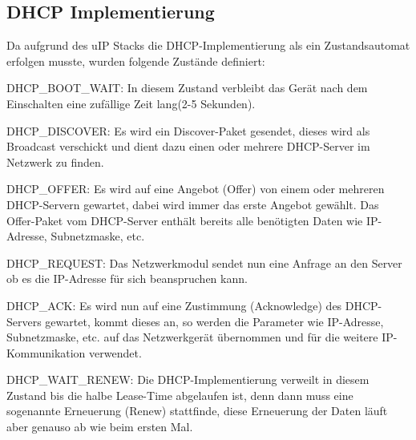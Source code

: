 \documentclass[a4paper,14pt,headsepline]{scrartcl}
\begin{document}
\subsection{DHCP Implementierung}
Da aufgrund des uIP Stacks die DHCP-Implementierung als ein Zustandsautomat erfolgen musste, wurden folgende Zustände definiert:

DHCP\_BOOT\_WAIT: In diesem Zustand verbleibt das Gerät nach dem Einschalten eine zufällige Zeit lang(2-5 Sekunden).

DHCP\_DISCOVER: Es wird ein Discover-Paket gesendet, dieses wird als Broadcast verschickt und dient dazu einen oder mehrere DHCP-Server im Netzwerk zu finden.

DHCP\_OFFER: Es wird auf eine Angebot (Offer) von einem oder mehreren DHCP-Servern gewartet, dabei wird immer das erste Angebot gewählt. Das Offer-Paket vom DHCP-Server enthält bereits alle benötigten Daten wie IP-Adresse, Subnetzmaske, etc.

DHCP\_REQUEST: Das Netzwerkmodul sendet nun eine Anfrage an den Server ob es die IP-Adresse für sich beanspruchen kann.

DHCP\_ACK: Es wird nun auf eine Zustimmung (Acknowledge) des DHCP-Servers gewartet, kommt dieses an, so werden die Parameter wie IP-Adresse, Subnetzmaske, etc. auf das Netzwerkgerät übernommen und für die weitere IP-Kommunikation verwendet.

DHCP\_WAIT\_RENEW: Die DHCP-Implementierung verweilt in diesem Zustand bis die halbe Lease-Time abgelaufen ist, denn dann muss eine sogenannte Erneuerung (Renew) stattfinde, diese Erneuerung der Daten läuft aber genauso ab wie beim ersten Mal.
\end{document}
